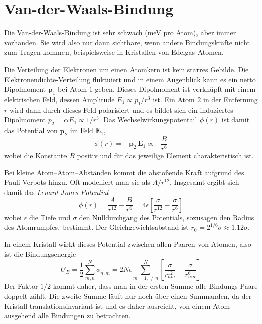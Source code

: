 \section{Van-der-Waals-Bindung}

Die Van-der-Waals-Bindung ist sehr schwach (meV pro Atom), aber immer vorhanden. Sie wird also nur dann sichtbare, wenn andere Bindungskräfte nicht zum Tragen kommen, beispielsweise in Kristallen von Edelgas-Atomen.

Die Verteilung der Elektronen um einen Atomkern ist kein starres Gebilde. Die Elektronendichte-Verteilung fluktuiert und in einem Augenblick kann es ein netto Dipolmoment $\mathbf{p}_1$ bei Atom $1$ geben. Dieses Dipolmoment ist verknüpft mit einem elektrischen Feld, dessen Amplitude $E_1 \propto p_1 / r^3$ ist. Ein Atom $2$ in der Entfernung $r$ wird dann durch dieses Feld polarisiert und es bildet sich ein induziertes Dipolmoment $p_2 = \alpha E_1 \propto 1/r^3$. Das Wechselwirkungspotentail $\phi(r)$ ist damit das Potential von $\mathbf{p}_2$ im Feld $\mathbf{E}_1$, 
\begin{equation}
 \phi(r) = - \mathbf{p}_2 \, \mathbf{E}_1 \propto - \frac{B}{r^6}
\end{equation}
wobei die Konstante $B$ positiv und für das jeweilige Element charakteristisch ist.

Bei kleine Atom--Atom--Abständen kommt die abstoßende Kraft aufgrund des Pauli-Verbots hinzu. Oft modelliert man sie als $A/r^{12}$. Insgesamt ergibt sich damit das \emph{Lenard-Jones-Potential}
\begin{equation}
\phi(r) = \frac{A}{r^{12}} - \frac{B}{r^{6}} = 4 \epsilon \left[ \frac{\sigma}{r^{12}} -  \frac{\sigma}{r^{6}} \right]
\end{equation}
wobei $\epsilon$ die Tiefe und $\sigma$ den Nulldurchgang des Potentials, sozusagen den Radius des Atomrumpfes, bestimmt. Der Gleichgewichtsabstand ist $r_0 = 2^{1/6} \sigma \approx 1.12 \sigma$.

In einem Kristall wirkt dieses Potential zwischen allen Paaren von Atomen, also ist die Bindungsenergie 
\begin{equation}
U_B = \frac{1}{2} \sum_{m,n}^N \phi_{n,m} = 
2 N \epsilon \sum_{m=1,   \neq n}^N 
\left[ 
\frac{\sigma}{r_{nm}^{12}} -  \frac{\sigma}{r_{nm}^{6}} 
\right]
\end{equation}
Der Faktor $1/2$ kommt daher, dass man in der ersten Summe alle Bindungs-Paare doppelt zählt. Die zweite Summe läuft nur noch über einen Summanden, da der Kristall translationsinvariant ist und es daher ausreicht, von einem Atom ausgehend alle Bindungen zu betrachten.

